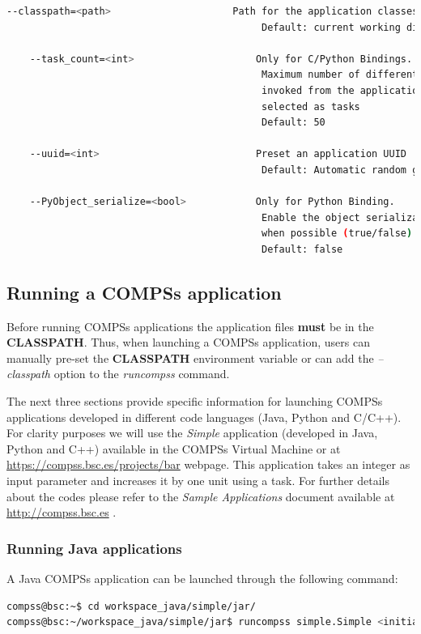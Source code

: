 \begin{lstlisting}[language=bash]
    --classpath=<path>                     Path for the application classes / modules
                                            Default: current working directory.
                                            
    --task_count=<int>                     Only for C/Python Bindings. 
                                            Maximum number of different functions/methods
                                            invoked from the application that have been 
                                            selected as tasks
                                            Default: 50
                                            
    --uuid=<int>                           Preset an application UUID
                                            Default: Automatic random generation
                                            
    --PyObject_serialize=<bool>            Only for Python Binding. 
                                            Enable the object serialization to string 
                                            when possible (true/false).
                                            Default: false

\end{lstlisting}

\subsection{Running a COMPSs application}
\label{subsec:running_compss}
Before running COMPSs applications the application files \textbf{must} be in the \textbf{CLASSPATH}.
Thus, when launching a COMPSs application, users can manually pre-set the \textbf{CLASSPATH} environment variable
or can add the \textit{--classpath} option to the \textit{runcompss} command.

The next three sections provide specific information for launching COMPSs applications developed in different code languages (Java, Python and 
C/C++). For clarity purposes we will use the \textit{Simple} application (developed in Java, Python and C++) available in the COMPSs
Virtual Machine or at \url{https://compss.bsc.es/projects/bar} webpage. This application takes an integer as input
parameter and increases it by one unit using a task. For further details about the codes please refer to the \textit{Sample 
Applications} document available at \url{http://compss.bsc.es} .

\subsubsection{Running Java applications}
A Java COMPSs application can be launched through the following command:
\begin{lstlisting}[language=bash]
compss@bsc:~$ cd workspace_java/simple/jar/
compss@bsc:~/workspace_java/simple/jar$ runcompss simple.Simple <initial_number>
\end{lstlisting}

